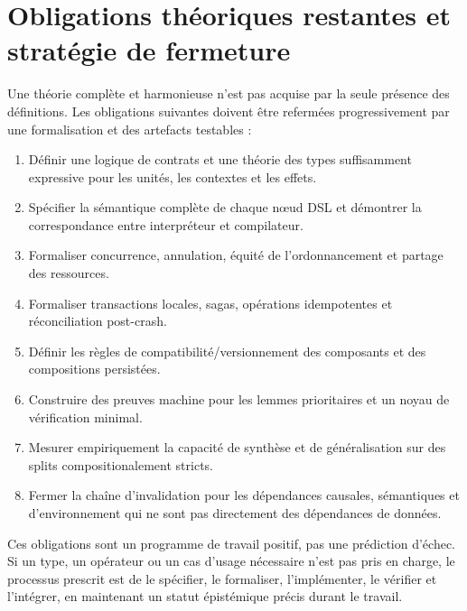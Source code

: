 \documentclass[11pt,a4paper]{article}
\theoremstyle{definition}
\theoremstyle{plain}
\theoremstyle{remark}
\begin{document}
\section{Obligations théoriques restantes et stratégie de fermeture}
Une théorie complète et harmonieuse n'est pas acquise par la seule présence des définitions. Les obligations suivantes doivent être refermées progressivement par une formalisation et des artefacts testables :
\begin{enumerate}
\item Définir une logique de contrats et une théorie des types suffisamment expressive pour les unités, les contextes et les effets.
\item Spécifier la sémantique complète de chaque nœud DSL et démontrer la correspondance entre interpréteur et compilateur.
\item Formaliser concurrence, annulation, équité de l'ordonnancement et partage des ressources.
\item Formaliser transactions locales, sagas, opérations idempotentes et réconciliation post-crash.
\item Définir les règles de compatibilité/versionnement des composants et des compositions persistées.
\item Construire des preuves machine pour les lemmes prioritaires et un noyau de vérification minimal.
\item Mesurer empiriquement la capacité de synthèse et de généralisation sur des splits compositionalement stricts.
\item Fermer la chaîne d'invalidation pour les dépendances causales, sémantiques et d'environnement qui ne sont pas directement des dépendances de données.
\end{enumerate}
Ces obligations sont un programme de travail positif, pas une prédiction d'échec. Si un type, un opérateur ou un cas d'usage nécessaire n'est pas pris en charge, le processus prescrit est de le spécifier, le formaliser, l'implémenter, le vérifier et l'intégrer, en maintenant un statut épistémique précis durant le travail.
\end{document}

